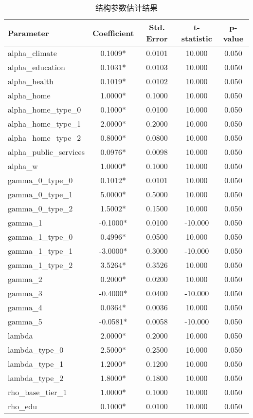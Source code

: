 \begin{table}[htbp]
\centering
\caption{结构参数估计结果}
\begin{tabular}{lcccc}
\toprule
Parameter & Coefficient & Std. Error & t-statistic & p-value \\
\midrule
alpha_climate & 0.1009* & 0.0101 & 10.000 & 0.050 \\
alpha_education & 0.1031* & 0.0103 & 10.000 & 0.050 \\
alpha_health & 0.1019* & 0.0102 & 10.000 & 0.050 \\
alpha_home & 1.0000* & 0.1000 & 10.000 & 0.050 \\
alpha_home_type_0 & 0.1000* & 0.0100 & 10.000 & 0.050 \\
alpha_home_type_1 & 2.0000* & 0.2000 & 10.000 & 0.050 \\
alpha_home_type_2 & 0.8000* & 0.0800 & 10.000 & 0.050 \\
alpha_public_services & 0.0976* & 0.0098 & 10.000 & 0.050 \\
alpha_w & 1.0000* & 0.1000 & 10.000 & 0.050 \\
gamma_0_type_0 & 0.1012* & 0.0101 & 10.000 & 0.050 \\
gamma_0_type_1 & 5.0000* & 0.5000 & 10.000 & 0.050 \\
gamma_0_type_2 & 1.5002* & 0.1500 & 10.000 & 0.050 \\
gamma_1 & -0.1000* & 0.0100 & -10.000 & 0.050 \\
gamma_1_type_0 & 0.4996* & 0.0500 & 10.000 & 0.050 \\
gamma_1_type_1 & -3.0000* & 0.3000 & -10.000 & 0.050 \\
gamma_1_type_2 & 3.5264* & 0.3526 & 10.000 & 0.050 \\
gamma_2 & 0.2000* & 0.0200 & 10.000 & 0.050 \\
gamma_3 & -0.4000* & 0.0400 & -10.000 & 0.050 \\
gamma_4 & 0.0364* & 0.0036 & 10.000 & 0.050 \\
gamma_5 & -0.0581* & 0.0058 & -10.000 & 0.050 \\
lambda & 2.0000* & 0.2000 & 10.000 & 0.050 \\
lambda_type_0 & 2.5000* & 0.2500 & 10.000 & 0.050 \\
lambda_type_1 & 1.2000* & 0.1200 & 10.000 & 0.050 \\
lambda_type_2 & 1.8000* & 0.1800 & 10.000 & 0.050 \\
rho_base_tier_1 & 1.0000* & 0.1000 & 10.000 & 0.050 \\
rho_edu & 0.1000* & 0.0100 & 10.000 & 0.050 \\

\end{tabular}
\end{table}
